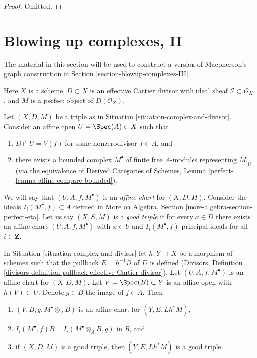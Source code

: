 \begin{proof}
Omitted.
\end{proof}





\section{Blowing up complexes, II}
\label{section-blowup-complexes-II}

\noindent
The material in this section will be used to construct a version of
Macpherson's graph construction in Section \ref{section-blowup-complexes-III}.
 
\begin{situation}
\label{situation-complex-and-divisor}
Here $X$ is a scheme, $D \subset X$ is an effective Cartier divisor
with ideal sheaf $\mathcal{I} \subset \mathcal{O}_X$, and
$M$ is a perfect object of $D(\mathcal{O}_X)$.
\end{situation}

\noindent
Let $(X, D, M)$ be a triple as in
Situation \ref{situation-complex-and-divisor}.
Consider an affine open $U = \Spec(A) \subset X$
such that
\begin{enumerate}
\item $D \cap U = V(f)$ for some nonzerodivisor $f \in A$, and
\item there exists a bounded complex $M^\bullet$ of
finite free $A$-modules representing $M|_U$ (via the equivalence of
Derived Categories of Schemes, Lemma
\ref{perfect-lemma-affine-compare-bounded}).
\end{enumerate}
We will say that $(U, A, f, M^\bullet)$ is an
{\it affine chart} for $(X, D, M)$.
Consider the ideals $I_i(M^\bullet, f) \subset A$ defined in
More on Algebra, Section \ref{more-algebra-section-perfect-eta}.
Let us say $(X, S, M)$ is a {\it good triple} if for every $x \in D$
there exists an affine chart $(U, A, f, M^\bullet)$
with $x \in U$ and $I_i(M^\bullet, f)$ principal ideals for all
$i \in \mathbf{Z}$.

\begin{lemma}
\label{lemma-pullback-triple-ideals-good}
In Situation \ref{situation-complex-and-divisor} let $h : Y \to X$ be a
morphism of schemes such that the pullback $E = h^{-1}D$ of $D$
is defined (Divisors, Definition
\ref{divisors-definition-pullback-effective-Cartier-divisor}).
Let $(U, A, f, M^\bullet)$ is an affine chart for $(X, D, M)$.
Let $V = \Spec(B) \subset Y$ is an affine open with $h(V) \subset U$.
Denote $g \in B$ the image of $f \in A$.
Then
\begin{enumerate}
\item $(V, B, g, M^\bullet \otimes_A B)$ is an affine chart for $(Y, E, Lh^*M)$,
\item $I_i(M^\bullet, f)B = I_i(M^\bullet \otimes_A B, g)$ in $B$, and
\item if $(X, D, M)$ is a good triple, then
$(Y, E, Lh^*M)$ is a good triple.
\end{enumerate}
\end{lemma}

